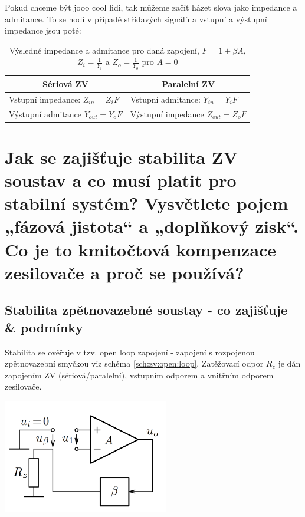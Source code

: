 \documentclass[a4paper,12pt]{article}   %
\begin{document}
Pokud chceme být jooo cool lidi, tak můžeme začít házet slova jako impedance a admitance. To se hodí v případě střídavých signálů a vstupní a výstupní impedance jsou poté:
\begin{table}[h!]
    \centering
    \begin{tabular}{|l|l|}
        \hline
        \multicolumn{1}{|c|}{Sériová ZV }& \multicolumn{1}{|c|}{Paralelní ZV}\\\hline\hline
        Vstupní impedance: $Z_{in} = Z_i F$ & Vstupní admitance: $Y_{in} = Y_i F$\\\hline
        Výstupní admitance $Y_{out} = Y_o F$ & Výstupní impedance $Z_{out} = Z_o F$\\\hline
    \end{tabular}
    \caption{Výsledné impedance a admitance pro daná zapojení, $F=1+\beta A$, $Z_i = \frac{1}{Y_i}$ a $Z_o = \frac{1}{Y_o}$ pro $A=0$}
\end{table}%










\section{Jak se zajišťuje stabilita ZV soustav a co musí platit pro stabilní systém? Vysvětlete pojem „fázová jistota“ a „doplňkový zisk“. Co je to kmitočtová kompenzace zesilovače a proč se používá?}
\subsection*{Stabilita zpětnovazebné soustay - co zajišťuje \& podmínky}
Stabilita se ověřuje v tzv. open loop zapojení - zapojení s rozpojenou zpětnovazební smyčkou viz schéma \ref{sch:zv:open:loop}. Zatěžovací odpor $R_z$ je dán zapojením ZV (sériová/paralelní), vstupním odporem a vnitřním odporem zesilovače.
\begin{schema}
    \centering
    \includegraphics[height=5cm]{ZV-open_loop.PNG}
    \caption{Určení přenosu rozpojené ZV smyčky}
    \label{sch:zv:open:loop}
\end{schema}
\end{document}
